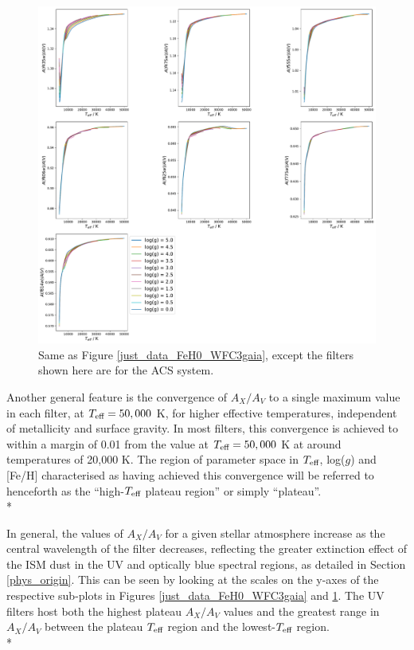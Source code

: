 \documentclass[12pt, a4paper]{report}
\begin{document}
\begin{figure}[h!]
\begin{center}
\includegraphics[width=1.0\textwidth]{../just_full_data/ACS/AHub_FeH0p0_just_Teff_plot_lines.pdf}
\caption{Same as Figure \ref{just_data_FeH0_WFC3gaia}, except the filters shown here are for the ACS system.}
\label{just_data_FeH0_ACS}
\end{center}
\end{figure}

Another general feature is the convergence of $A_{X}/A_{V}$ to a single maximum value in each filter, at $T_{\textnormal{eff}} = 50,000$ K, for higher effective temperatures, independent of metallicity and surface gravity. In most filters, this convergence is achieved to within a margin of 0.01 from the value at $T_{\textnormal{eff}} = 50,000$ K at around temperatures of 20,000 K. The region of parameter space in $T_{\textnormal{eff}}$, log($g$) and [Fe/H] characterised as having achieved this convergence will be referred to henceforth as the ``high-$T_{\textnormal{eff}}$ plateau region'' or simply ``plateau''.\\*

In general, the values of $A_{X}/A_{V}$ for a given stellar atmosphere increase as the central wavelength of the filter decreases, reflecting the greater extinction effect of the ISM dust in the UV and optically blue spectral regions, as detailed in Section \ref{phys_origin}. This can be seen by looking at the scales on the y-axes of the respective sub-plots in Figures \ref{just_data_FeH0_WFC3gaia} and \ref{just_data_FeH0_ACS}. The UV filters host both the highest plateau $A_{X}/A_{V}$ values and the greatest range in $A_{X}/A_{V}$ between the plateau $T_{\textnormal{eff}}$ region and the lowest-$T_{\textnormal{eff}}$ region. \\*
\end{document}
